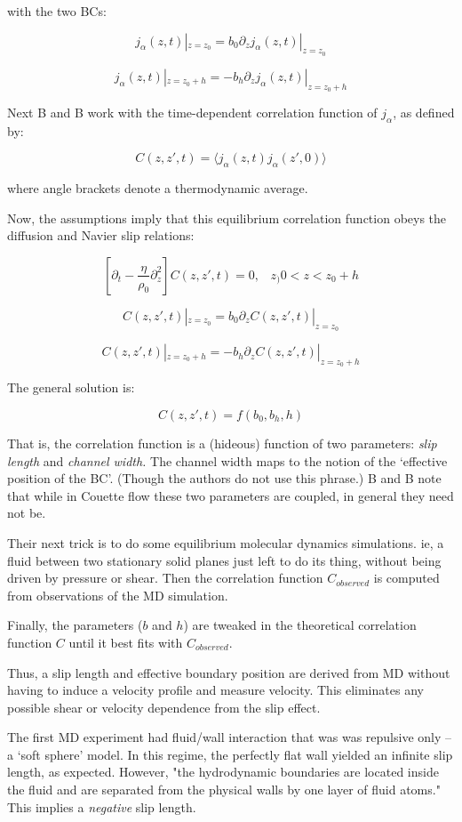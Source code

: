 \documentclass[twocolumn]{article}
\begin{document}
with the two BCs:

\[ j_{\alpha}(z,t)|_{z=z_{0}} = b_{0} \partial_{z} j_{\alpha} (z,t)|_{z=z_{0}} \]

\[ j_{\alpha}(z,t)|_{z=z_{0}+h} = -b_{h} \partial_{z} j_{\alpha} (z,t)|_{z=z_{0}+h} \]


Next B and B work with the time-dependent correlation function of $j_{\alpha}$, as defined by:

\[ C(z,z',t) = \langle j_{\alpha}(z,t)j_{\alpha}(z',0) \rangle \]

where angle brackets denote a thermodynamic average.

Now, the assumptions imply that this equilibrium correlation function obeys the diffusion and Navier slip relations:

\[ \left[  \partial_{t} - \frac{\eta}{\rho_{0}} \partial^{2}_{z} \right] 
  C(z,z',t) = 0, \;\;\; z_){0} < z < z_{0}+h \]

\[ C(z,z',t)|_{z=z_{0}} = b_{0} \partial_{z} C(z,z',t)|_{z=z_{0}} \]

\[ C(z,z',t)|_{z=z_{0}+h} = -b_{h} \partial_{z} C(z,z',t)|_{z=z_{0}+h} \]

The general solution is:

\[ C(z,z',t) = f(b_{0},b_{h}, h) \]

That is, the correlation function is a (hideous) function of two parameters: \emph{slip length} and \emph{channel width.} The channel width maps to the notion of the `effective position of the BC'. (Though the authors do not use this phrase.) B and B note that while in Couette flow these two parameters are coupled, in general they need not be.

Their next trick is to do some equilibrium molecular dynamics simulations. ie, a fluid between two stationary solid planes just left to do its thing, without being driven by pressure or shear.  Then the correlation function $C_{observed}$ is computed from observations of the MD simulation.

Finally, the parameters ($b$ and $h$) are tweaked in the theoretical correlation function $C$ until it best fits with $C_{observed}$.

Thus, a slip length and effective boundary position are derived from MD without having to induce a velocity profile and measure velocity.  This eliminates any possible shear or velocity dependence from the slip effect.

The first MD experiment had fluid/wall interaction that was was repulsive only -- a `soft sphere' model. In this regime, the perfectly flat wall yielded an infinite slip length, as expected. However, "the hydrodynamic boundaries are located inside the fluid and are separated from the physical walls by one layer of fluid atoms." This implies a \emph{negative} slip length.
\end{document}
